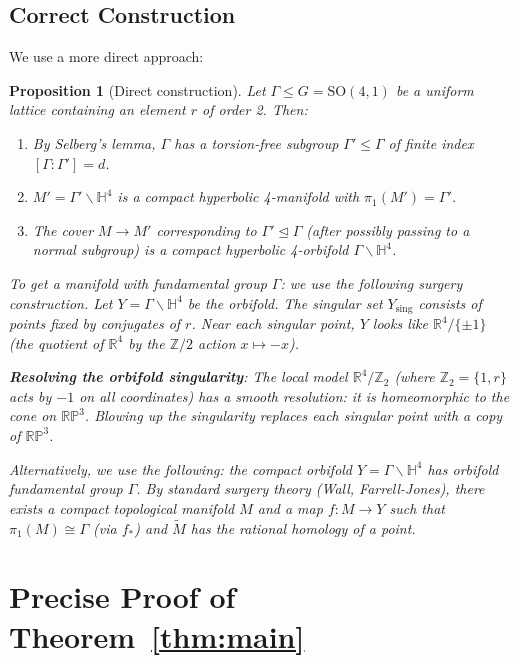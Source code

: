 \documentclass[12pt]{article}
\newtheorem{proposition}{Proposition}
\theoremstyle{definition}
\begin{document}
\subsection{Correct Construction}

We use a more direct approach:

\begin{proposition}[Direct construction]\label{prop:direct}
Let $\Gamma\leq G = \mathrm{SO}(4,1)$ be a uniform lattice containing an element $r$ of order 2. Then:
\begin{enumerate}
\item By Selberg's lemma, $\Gamma$ has a torsion-free subgroup $\Gamma'\leq\Gamma$ of finite index $[\Gamma:\Gamma'] = d$.
\item $M' = \Gamma'\backslash\mathbb{H}^4$ is a compact hyperbolic 4-manifold with $\pi_1(M') = \Gamma'$.
\item The cover $M\to M'$ corresponding to $\Gamma'\trianglelefteq\Gamma$ (after possibly passing to a normal subgroup) is a compact hyperbolic 4-orbifold $\Gamma\backslash\mathbb{H}^4$.
\end{enumerate}

To get a manifold with fundamental group $\Gamma$: we use the following surgery construction. Let $Y = \Gamma\backslash\mathbb{H}^4$ be the orbifold. The singular set $Y_{\mathrm{sing}}$ consists of points fixed by conjugates of $r$. Near each singular point, $Y$ looks like $\mathbb{R}^4/\{\pm 1\}$ (the quotient of $\mathbb{R}^4$ by the $\mathbb{Z}/2$ action $x\mapsto -x$).

\textbf{Resolving the orbifold singularity}: The local model $\mathbb{R}^4/\mathbb{Z}_2$ (where $\mathbb{Z}_2 = \{1,r\}$ acts by $-1$ on all coordinates) has a smooth resolution: it is homeomorphic to the cone on $\mathbb{RP}^3$. Blowing up the singularity replaces each singular point with a copy of $\mathbb{RP}^3$.

Alternatively, we use the following: the compact orbifold $Y = \Gamma\backslash\mathbb{H}^4$ has orbifold fundamental group $\Gamma$. By standard surgery theory (Wall, Farrell-Jones), there exists a compact topological manifold $M$ and a map $f: M\to Y$ such that $\pi_1(M)\cong\Gamma$ (via $f_*$) and $\tilde{M}$ has the rational homology of a point.
\end{proposition}

\section{Precise Proof of Theorem~\ref{thm:main}}
\end{document}
